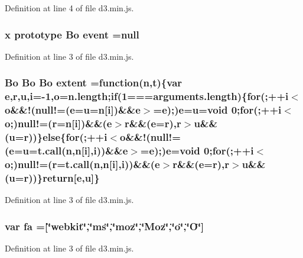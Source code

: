 Definition at line 4 of file d3.\+min.\+js.

\subsubsection[{event}]{ {\bf x} {\bf prototype} {\bf Bo} event =null}\label{d3_8min_8js_a458230cc7034a0c3ac8c617d7111cc93}


Definition at line 3 of file d3.\+min.\+js.

\subsubsection[{extent}]{ {\bf Bo} {\bf Bo} {\bf Bo} extent =function({\bf n},t)\{var {\bf e},{\bf r},u,{\bf i}=-\/1,{\bf o}=n.\+length;{\bf if}(1===arguments.\+length)\{{\bf for}(;++{\bf i}$<${\bf o}\&\&!(null!=({\bf e}=u={\bf n}[{\bf i}])\&\&{\bf e}$>$={\bf e});){\bf e}=u=void 0;{\bf for}(;++{\bf i}$<${\bf o};)null!=({\bf r}={\bf n}[{\bf i}])\&\&({\bf e}$>${\bf r}\&\&({\bf e}={\bf r}),{\bf r}$>$u\&\&(u={\bf r}))\}{\bf else}\{{\bf for}(;++{\bf i}$<${\bf o}\&\&!(null!=({\bf e}=u={\bf t.\+call}({\bf n},{\bf n}[{\bf i}],{\bf i}))\&\&{\bf e}$>$={\bf e});){\bf e}=void 0;{\bf for}(;++{\bf i}$<${\bf o};)null!=({\bf r}={\bf t.\+call}({\bf n},{\bf n}[{\bf i}],{\bf i}))\&\&({\bf e}$>${\bf r}\&\&({\bf e}={\bf r}),{\bf r}$>$u\&\&(u={\bf r}))\}{\bf return}[{\bf e},u]\}}\label{d3_8min_8js_a41ea254b8a04f8cd52739b5d65a089a0}


Definition at line 3 of file d3.\+min.\+js.

\subsubsection[{fa}]{\setlength{\rightskip}{0pt plus 5cm}var fa =[\char`\"{}webkit\char`\"{},\char`\"{}ms\char`\"{},\char`\"{}moz\char`\"{},\char`\"{}Moz\char`\"{},\char`\"{}{\bf o}\char`\"{},\char`\"{}O\char`\"{}]}\label{d3_8min_8js_a46a2e37895f5df88d0930494c292c518}


Definition at line 3 of file d3.\+min.\+js.


